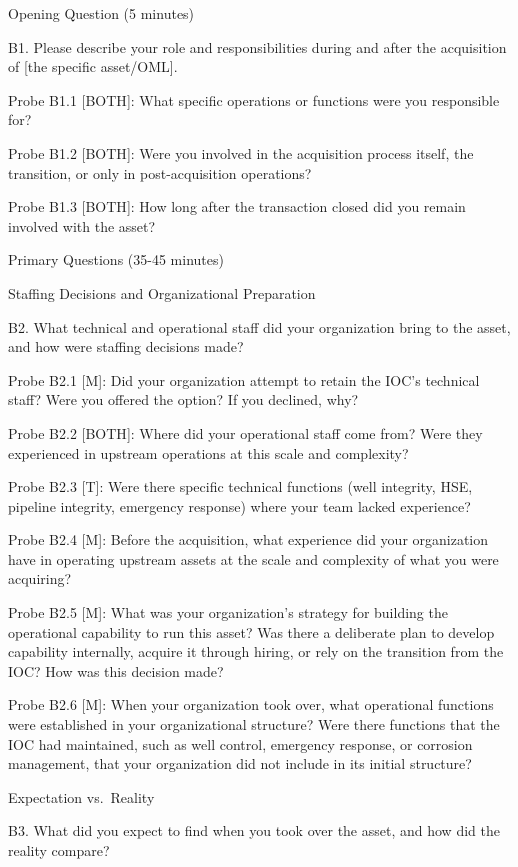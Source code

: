 Opening Question (5 minutes)

B1. Please describe your role and responsibilities during and after the
acquisition of {[}the specific asset/OML{]}.

Probe B1.1 {[}BOTH{]}: What specific operations or functions were you
responsible for?

Probe B1.2 {[}BOTH{]}: Were you involved in the acquisition process
itself, the transition, or only in post-acquisition operations?

Probe B1.3 {[}BOTH{]}: How long after the transaction closed did you
remain involved with the asset?

Primary Questions (35-45 minutes)

Staffing Decisions and Organizational Preparation

B2. What technical and operational staff did your organization bring to
the asset, and how were staffing decisions made?

Probe B2.1 {[}M{]}: Did your organization attempt to retain the IOC's
technical staff? Were you offered the option? If you declined, why?

Probe B2.2 {[}BOTH{]}: Where did your operational staff come from? Were
they experienced in upstream operations at this scale and complexity?

Probe B2.3 {[}T{]}: Were there specific technical functions (well
integrity, HSE, pipeline integrity, emergency response) where your team
lacked experience?

Probe B2.4 {[}M{]}: Before the acquisition, what experience did your
organization have in operating upstream assets at the scale and
complexity of what you were acquiring?

Probe B2.5 {[}M{]}: What was your organization's strategy for building
the operational capability to run this asset? Was there a deliberate
plan to develop capability internally, acquire it through hiring, or
rely on the transition from the IOC? How was this decision made?

Probe B2.6 {[}M{]}: When your organization took over, what operational
functions were established in your organizational structure? Were there
functions that the IOC had maintained, such as well control, emergency
response, or corrosion management, that your organization did not
include in its initial structure?

Expectation vs.~Reality

B3. What did you expect to find when you took over the asset, and how
did the reality compare?

